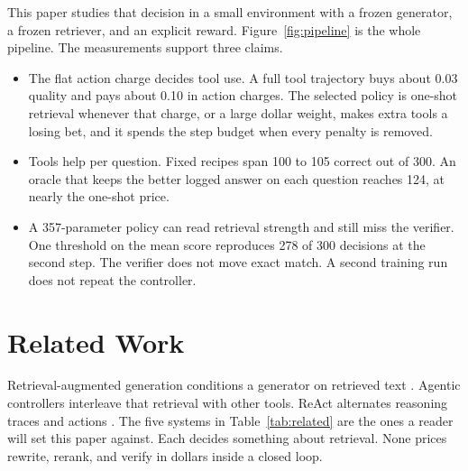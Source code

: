 \documentclass[letterpaper]{article} %
\begin{document}
This paper studies that decision in a small environment with a frozen generator, a frozen retriever, and an explicit reward. Figure~\ref{fig:pipeline} is the whole pipeline. The measurements support three claims.
\begin{itemize}
\item The flat action charge decides tool use. A full tool trajectory buys about 0.03 quality and pays about 0.10 in action charges. The selected policy is one-shot retrieval whenever that charge, or a large dollar weight, makes extra tools a losing bet, and it spends the step budget when every penalty is removed.
\item Tools help per question. Fixed recipes span 100 to 105 correct out of 300. An oracle that keeps the better logged answer on each question reaches 124, at nearly the one-shot price.
\item A 357-parameter policy can read retrieval strength and still miss the verifier. One threshold on the mean score reproduces 278 of 300 decisions at the second step. The verifier does not move exact match. A second training run does not repeat the controller.
\end{itemize}

\section{Related Work}
Retrieval-augmented generation conditions a generator on retrieved text \cite{lewis2020rag}. Agentic controllers interleave that retrieval with other tools. ReAct alternates reasoning traces and actions \cite{yao2023react}. The five systems in Table~\ref{tab:related} are the ones a reader will set this paper against. Each decides something about retrieval. None prices rewrite, rerank, and verify in dollars inside a closed loop.
\end{document}
